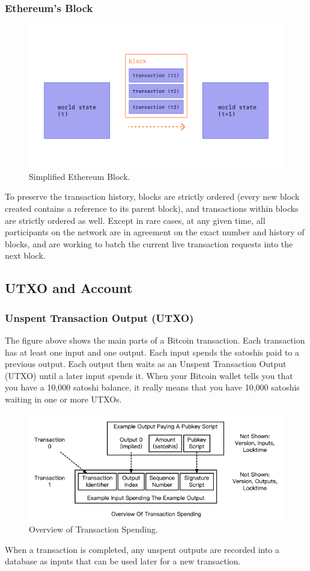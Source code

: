 \documentclass{article}
\begin{document}
\subsubsection{Ethereum's Block}
\begin{figure}[h]
\centering
\includegraphics[width=1\textwidth]{eth_block.png}
\caption{\label{fig:eth_block}Simplified Ethereum Block.}
\end{figure}
To preserve the transaction history, blocks are strictly ordered (every new block created contains a reference to its parent block), and transactions within blocks are strictly ordered as well. Except in rare cases, at any given time, all participants on the network are in agreement on the exact number and history of blocks, and are working to batch the current live transaction requests into the next block. \cite{ethpaper}
\subsection{UTXO and Account}
\subsubsection{Unspent Transaction Output (UTXO)}
The figure above shows the main parts of a Bitcoin transaction. Each transaction has at least one input and one output. Each input spends the satoshis paid to a previous output. Each output then waits as an Unspent Transaction Output (UTXO) until a later input spends it. When your Bitcoin wallet tells you that you have a 10,000 satoshi balance, it really means that you have 10,000 satoshis waiting in one or more UTXOs.
\begin{figure}[h]
\centering
\includegraphics[width=1\textwidth]{utxo.png}
\caption{\label{fig:utxo}Overview of Transaction Spending.}
\end{figure}
\par When a transaction is completed, any unspent outputs are recorded into a database as inputs that can be used later for a new transaction.
\end{document}
